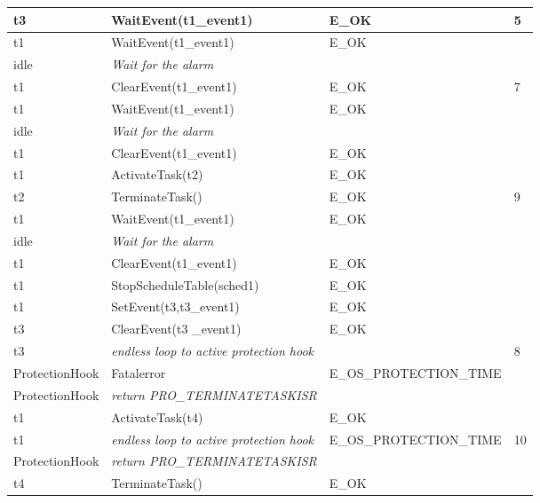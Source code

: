 \documentclass[10pt]{article}
\newlength{\Li}\settowidth{\Li}{Running}
\newlength{\Lii}\setlength{\Lii}{7cm}
\newlength{\Liiii}\setlength{\Liiii}{0.9cm}
\newlength{\Liii}\setlength{\Liii}{\textwidth} \addtolength{\Liii}{-\Li} \addtolength{\Liii}{-\Lii} \addtolength{\Liii}{-\Liiii}
\begin{document}
	\begin{supertabular}{|p{\Li}|p{\Lii}|p{\Liii}|p{\Liiii}|} \hline 
	t3	& WaitEvent(t1\_event1)							& E\_OK											& 5 \\ \hline
	t1	& WaitEvent(t1\_event1)							& E\_OK											& \\ \hline
	idle	& \textit{Wait for the alarm}					& 												& \\ \hline
	t1	& ClearEvent(t1\_event1)						& E\_OK											& 7 \\ \hline
	t1	& WaitEvent(t1\_event1)							& E\_OK											& \\ \hline
	idle	& \textit{Wait for the alarm}					& 												& \\ \hline
	t1	& ClearEvent(t1\_event1)						& E\_OK											& \\ \hline
	t1	& ActivateTask(t2)							& E\_OK											& \\ \hline
	t2	& TerminateTask()							& E\_OK											& 9 \\ \hline
	t1	& WaitEvent(t1\_event1)							& E\_OK											& \\ \hline
	idle	& \textit{Wait for the alarm}					& 												& \\ \hline
	t1	& ClearEvent(t1\_event1)						& E\_OK											& \\ \hline
	t1	& StopScheduleTable(sched1)					& E\_OK											& \\ \hline
	t1	& SetEvent(t3,t3\_event1)						& E\_OK											& \\ \hline
	t3	& ClearEvent(t3 \_event1)						& E\_OK											& \\ \hline
	t3	& \textit{endless loop to active protection hook}		& 												& 8 \\ \hline
	ProtectionHook		& Fatalerror					& E\_OS\_PROTECTION\_TIME 						& \\ \hline
	ProtectionHook		& \textit{return PRO\_TERMINATETASKISR}	& & \\ \hline
	t1	& ActivateTask(t4)							& E\_OK											& \\ \hline
	t1	& \textit{endless loop to active protection hook}		& E\_OS\_PROTECTION\_TIME						& 10 \\ \hline
	ProtectionHook		& \textit{return PRO\_TERMINATETASKISR}	& & \\ \hline
	t4	& TerminateTask()							& E\_OK											& \\ \hline
	\end{supertabular}\\
\end{document}
